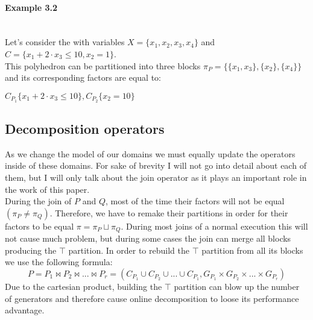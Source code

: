  
\paragraph{Example 3.2} \mbox{}\\
Let's consider the with variables $X = \{x_1,x_2,x_3,x_4\}$ and $C = \{ x_1 + 2 \cdot x_3 \leq 10, x_2 = 1 \}$.\\
This polyhedron can be partitioned into three blocks $\pi_P = \{\{x_1,x_3\},\{x_2\},\{x_4\}\}$ and its corresponding factors are equal to:
\begin{center}
	$C_{P_1}\{x_1 + 2\cdot x_3 \leq 10 \} , C_{P_2}\{x_2 = 10 \}$
\end{center}


\subsection{Decomposition operators}
As we change the model of our domains we must equally update the operators inside of these domains. For sake of brevity I will not go into detail about each of them, but I will only talk about the join operator as it plays an important role in the work of this paper.\\
During the join of $P$ and $Q$, most of the time their factors will not be equal$(\pi_P \neq \pi_Q)$. Therefore, we have to remake their partitions in order for their factors to be equal $\pi = \pi_P\sqcup\pi_Q$. During most joins of a normal execution this will not cause much problem, but during some cases the join can merge all blocks producing the $\top$ partition. In order to rebuild the $\top$ partition from all its blocks we use the following formula:
\begin{equation}
	P = P_1 \Join P_2 \Join ... \Join P_r = (C_{P_1} \cup C_{P_2} \cup ... \cup C_{P_1}, G_{P_1} \times G_{P_2} \times  ... \times   G_{P_r})
\end{equation}
Due to the cartesian product, building the $\top$ partition can blow up the number of generators and therefore cause online decomposition to loose its performance advantage.

